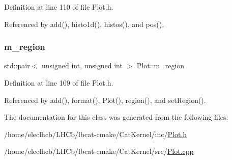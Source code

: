 Definition at line 110 of file Plot.\+h.



Referenced by add(), histo1d(), histos(), and pos().

\mbox{\label{classPlot_aabcbba1cfc66babcbcd647fdf90cdbf1}} 
\subsubsection{\texorpdfstring{m\+\_\+region}{m\_region}}
{\footnotesize\ttfamily std\+::pair$<$ unsigned int, unsigned int $>$ Plot\+::m\+\_\+region\hspace{0.3cm}{\ttfamily [private]}}



Definition at line 109 of file Plot.\+h.



Referenced by add(), format(), Plot(), region(), and set\+Region().



The documentation for this class was generated from the following files\+:\begin{DoxyCompactItemize}
\item 
/home/eleclhcb/\+L\+H\+Cb/lbcat-\/cmake/\+Cat\+Kernel/inc/\hyperlink{Plot_8h}{Plot.\+h}\item 
/home/eleclhcb/\+L\+H\+Cb/lbcat-\/cmake/\+Cat\+Kernel/src/\hyperlink{Plot_8cpp}{Plot.\+cpp}\end{DoxyCompactItemize}
